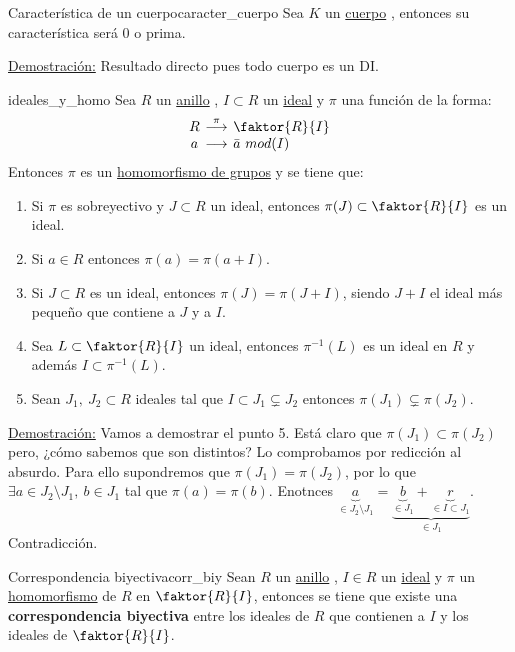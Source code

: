 \documentclass[10pt, a4paper]{article}
\newcommand{\demo}{\underline{Demostración:} }
\newcommand{\anillo}[1][]{\hyperref[def:anillo]{anillo}#1 }
\newcommand{\cuerpo}[1][]{\hyperref[def:cuerpo]{cuerpo}#1 }
\begin{document}
\begin{corolary}{Característica de un cuerpo}{caracter_cuerpo}
Sea $K$ un \cuerpo, entonces su característica será $0$ o prima.
\end{corolary}

\demo Resultado directo pues todo cuerpo es un DI.

\begin{proposition}{}{ideales_y_homo}
Sea $R$ un \anillo, $I \subset R$ un \hyperref[def:ideal]{ideal} y $\pi$ una función de la forma:
\[\arraycolsep=2pt
\begin{array}{ccl}
	R & \overset{\pi}{\longrightarrow} & \faktor{R}{I} \\
	a & \longrightarrow & \bar{a}\ mod(I)
\end{array}
\]
Entonces $\pi$ es un \hyperref[def:homomorfismo]{homomorfismo de grupos} y se tiene que:

\begin{enumerate}
	\item Si $\pi$ es sobreyectivo y $J \subset R$ un ideal, entonces $\pi(J) \subset \faktor{R}{I}$ es un ideal.
	\item Si $a \in R$ entonces $\pi(a) = \pi(a + I)$.
	\item Si $J \subset R$ es un ideal, entonces $\pi(J) = \pi(J + I)$, siendo $J + I$ el ideal más pequeño que contiene a $J$ y a $I$.
	\item Sea $L \subset \faktor{R}{I}$ un ideal, entonces $\pi^{-1}(L)$ es un ideal en $R$ y además $I \subset \pi^{-1}(L)$.
	\item Sean $J_1,\ J_2 \subset R$ ideales tal que $I \subset J_1 \subsetneq J_2$ entonces $\pi(J_1) \subsetneq \pi(J_2)$.
\end{enumerate}
\end{proposition}

\demo Vamos a demostrar el punto 5. Está claro que $\pi(J_1) \subset \pi(J_2)$ pero, ¿cómo sabemos que son distintos? Lo comprobamos por redicción al absurdo. Para ello supondremos que $\pi(J_1) = \pi(J_2)$, por lo que $\exists a \in J_2 \setminus J_1,\ b \in J_1$ tal que $\pi(a) = \pi(b)$. Enotnces $\underbrace{a}_{\in J_2 \setminus J_1} = \underbrace{\underbrace{b}_{\in J_1} + \underbrace{r}_{\in I \subset J_1}}_{\in J_1}$. Contradicción.

\begin{theorem}{Correspondencia biyectiva}{corr_biy}
Sean $R$ un \anillo, $I \in R$ un \hyperref[def:ideal]{ideal} y $\pi$ un \hyperref[def:homomorfismo]{homomorfismo} de $R$ en $\faktor{R}{I}$, entonces se tiene que existe una \textbf{correspondencia biyectiva} entre los ideales de $R$ que contienen a $I$ y los ideales de $\faktor{R}{I}$.
\end{theorem}
\end{document}
